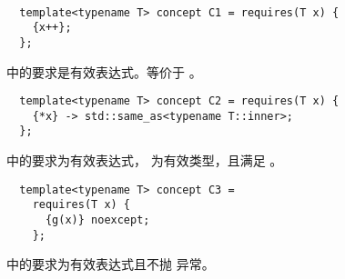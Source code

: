 \paragraph{} %
\begin{example}
  \begin{lstlisting}
  template<typename T> concept C1 = requires(T x) {
    {x++};
  };
  \end{lstlisting}
  中的要求是有效表达式。等价于
   。
  \begin{lstlisting}
  template<typename T> concept C2 = requires(T x) {
    {*x} -> std::same_as<typename T::inner>;
  };
  \end{lstlisting}
  中的要求为有效表达式，
  为有效类型，且满足
  。
  \begin{lstlisting}
  template<typename T> concept C3 =
    requires(T x) {
      {g(x)} noexcept;
    };
  \end{lstlisting}
  中的要求为有效表达式且不抛
  异常。
\end{example}

